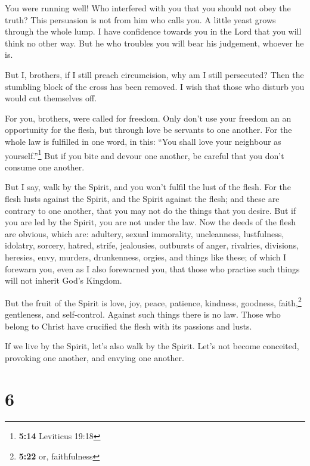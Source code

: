  You were running well! Who interfered with you that you
should not obey the truth?  This persuasion is not from
him who calls you.  A little yeast grows through the whole
lump.  I have confidence towards you in the Lord that you
will think no other way. But he who troubles you will bear his
judgement, whoever he is.

 But I, brothers, if I still preach circumcision, why am
I still persecuted? Then the stumbling block of the cross has been
removed.  I wish that those who disturb you would cut
themselves off.

 For you, brothers, were called for freedom. Only don't
use your freedom an an opportunity for the flesh, but through love be
servants to one another.  For the whole law is fulfilled
in one word, in this: ``You shall love your neighbour as
yourself.''\footnote{\textbf{5:14} Leviticus 19:18}  But
if you bite and devour one another, be careful that you don't consume
one another.

 But I say, walk by the Spirit, and you won't fulfil the
lust of the flesh.  For the flesh lusts against the
Spirit, and the Spirit against the flesh; and these are contrary to one
another, that you may not do the things that you desire. 
But if you are led by the Spirit, you are not under the law.
 Now the deeds of the flesh are obvious, which are:
adultery, sexual immorality, uncleanness, lustfulness, 
idolatry, sorcery, hatred, strife, jealousies, outbursts of anger,
rivalries, divisions, heresies,  envy, murders,
drunkenness, orgies, and things like these; of which I forewarn you,
even as I also forewarned you, that those who practise such things will
not inherit God's Kingdom.

 But the fruit of the Spirit is love, joy, peace,
patience, kindness, goodness, faith,\footnote{\textbf{5:22} or,
  faithfulness}  gentleness, and self-control. Against
such things there is no law.  Those who belong to Christ
have crucified the flesh with its passions and lusts.

 If we live by the Spirit, let's also walk by the Spirit.
 Let's not become conceited, provoking one another, and
envying one another.

\hypertarget{section-5}{%
\section{6}\label{section-5}}

